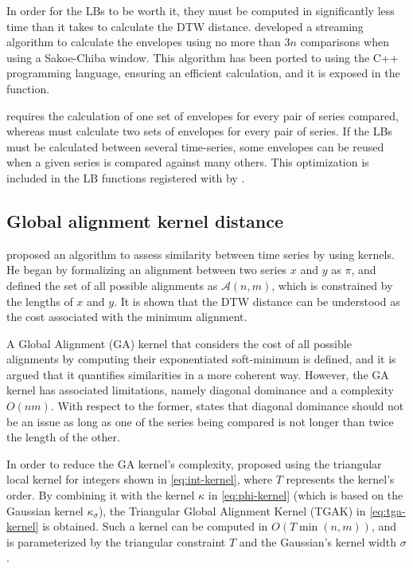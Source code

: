 In order for the LBs to be worth it,
they must be computed in significantly less time than it takes to calculate the DTW distance.
\citet{lemire2009} developed a streaming algorithm to calculate the envelopes using no more than $3n$ comparisons when using a Sakoe-Chiba window.
This algorithm has been ported to \dtwclust{} using the C++ programming language,
ensuring an efficient calculation,
and it is exposed in the  function.

 requires the calculation of one set of envelopes for every pair of series compared,
whereas  must calculate two sets of envelopes for every pair of series.
If the LBs must be calculated between several time-series,
some envelopes can be reused when a given series is compared against many others.
This optimization is included in the LB functions registered with  by \dtwclust{}.

\subsection{Global alignment kernel distance}
\label{sec:gak}

\citet{cuturi2011} proposed an algorithm to assess similarity between time series by using kernels.
He began by formalizing an alignment between two series $x$ and $y$ as $\pi$,
and defined the set of all possible alignments as $\mathcal{A}(n,m)$,
which is constrained by the lengths of $x$ and $y$.
It is shown that the DTW distance can be understood as the cost associated with the minimum alignment.

A Global Alignment (GA) kernel that considers the cost of all possible alignments by computing their exponentiated soft-minimum is defined,
and it is argued that it quantifies similarities in a more coherent way.
However, the GA kernel has associated limitations,
namely diagonal dominance and a complexity $O(nm)$.
With respect to the former,
\citet{cuturi2011} states that diagonal dominance should not be an issue as long as one of the series being compared is not longer than twice the length of the other.

In order to reduce the GA kernel's complexity,
\citet{cuturi2011} proposed using the triangular local kernel for integers shown in \cref{eq:int-kernel},
where $T$ represents the kernel's order.
By combining it with the kernel $\kappa$ in \cref{eq:phi-kernel}
(which is based on the Gaussian kernel $\kappa_\sigma$),
the Triangular Global Alignment Kernel (TGAK) in \cref{eq:tga-kernel} is obtained.
Such a kernel can be computed in $O(T \min(n,m))$,
and is parameterized by the triangular constraint $T$ and the Gaussian's kernel width $\sigma$.

